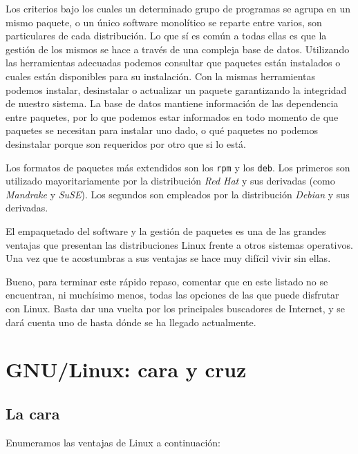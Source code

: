 Los criterios  bajo los  cuales un determinado  grupo de  programas se
agrupa en un mismo paquete, o  un único software monolítico se reparte
entre  varios, son  particulares de  cada distribución.  Lo que  sí es
común  a todas  ellas  es que  la  gestión  de los  mismos  se hace  a
través  de una  compleja base  de datos.  Utilizando las  herramientas
adecuadas  podemos consultar  que paquetes  están instalados  o cuales
están  disponibles para  su  instalación. Con  la mismas  herramientas
podemos instalar, desinstalar o  actualizar un paquete garantizando la
integridad de nuestro  sistema. La base de  datos mantiene información
de las dependencia entre paquetes, por lo que podemos estar informados
en todo momento de que paquetes se necesitan para instalar uno dado, o
qué paquetes no podemos desinstalar porque son requeridos por otro que
si lo está.

Los formatos de paquetes más extendidos son los {\tt rpm} y
los {\tt deb}. Los  primeros son utilizado mayoritariamente
por la distribución {\em Red Hat} y sus derivadas (como {\em Mandrake}
y {\em  SuSE}). Los  segundos son empleados  por la  distribución {\em
Debian} y sus derivadas.

El empaquetado  del software y  la gestión de  paquetes es una  de las
grandes ventajas que presentan las distribuciones Linux frente a otros
sistemas operativos. Una vez que te acostumbras a sus ventajas se hace
muy difícil vivir sin ellas.

Bueno, para terminar este rápido  repaso, comentar que en este listado
no se  encuentran, ni muchísimo menos,  todas las opciones de  las que
puede disfrutar  con Linux. Basta  dar una vuelta por  los principales
buscadores de  Internet, y  se dará  cuenta uno de  hasta dónde  se ha
llegado actualmente.

\section{GNU/Linux: cara y cruz}

\subsection{La cara}

Enumeramos las ventajas de Linux a continuación:

